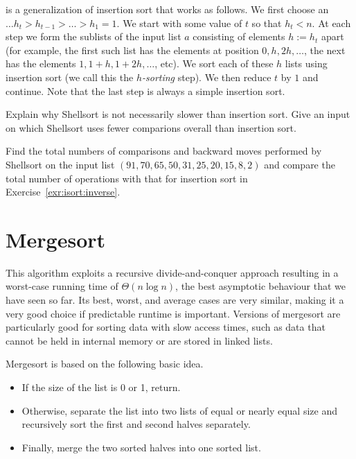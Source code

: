 \begin{Exercise}\label{exr:shellsort}

 is a generalization of insertion sort that works as follows. We first 
choose an  $ \dots h_{t} > h_{t-1} > \ldots > h_{1}=1$. 
We start with some value of $t$ so that $h_t<n$. At each step we form the 
sublists of the input list $a$ consisting of elements $h:=h_t$ apart (for example, 
the first such list has the elements at position $0, h, 2h, \dots $, the next 
has the elements $1, 1+h, 1+2h, \dots $, etc). We sort each of these $h$ lists 
using insertion sort (we call this the \emph{$h$-sorting} step). We then reduce 
$t$ by $1$ and continue. Note that the last step is always a simple insertion 
sort.

Explain why Shellsort is not necessarily slower than insertion sort. Give an input 
on which Shellsort uses fewer comparions overall than insertion sort.
\end{Exercise}


\begin{Exercise}\label{exr:comparedata}
Find the total numbers of comparisons and backward moves performed by Shellsort on the 
input list \((91,70,65,50,31,25,20,15,8,2)\) and compare 
the total number of operations with that for insertion sort in 
Exercise~\ref{exr:isort:inverse}.
\end{Exercise}




\section{Mergesort}\label{sec:mergesort}

This algorithm exploits a recursive divide-and-conquer
approach resulting in a worst-case running time of $\Theta(n \log n)$, the 
best asymptotic behaviour that we have seen so far. Its best, worst, and average
cases are very similar, making it a very good choice if predictable runtime is 
important. Versions of mergesort are particularly good for sorting data with 
slow access times, such as data that cannot be held in internal memory or are 
stored in linked lists.
 
Mergesort is based on the following basic idea.
\begin{itemize}
\item If the size of the list is 0 or 1, return.
\item Otherwise, separate the list into two lists of equal or nearly equal size 
and recursively sort the first and second halves separately.
\item Finally, merge the two sorted halves into one sorted list.
\end{itemize}

